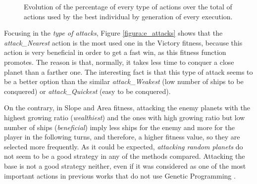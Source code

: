 \documentclass[preprint]{elsarticle}
\begin{document}
  \begin{figure}[ht]
  \begin{center}
  \end{center}
  \caption{Evolution of the percentage of every type of actions over the total of actions used by the best individual by generation of every execution.
  }
  \label{figura:e_actions}
  \end{figure}

Focusing in the {\em type of attacks}, Figure \ref{figura:e_attacks} shows that the \emph{attack\_Nearest} action is the most used one in the Victory fitness, because this action is very beneficial in order to get a fast win, as this fitness function promotes. The reason is that, normally, it takes less time to conquer a close planet than a farther one. The interesting fact is that this type of attack seems to be a better option than the similar \emph{attack\_Weakest} (low number of ships to be conquered) or \emph{attack\_Quickest} (easy to be conquered).

On the contrary, in Slope and Area fitness, attacking the enemy planets with the 
highest growing ratio ({\em wealthiest}) and the ones with high growing ratio but low number of ships ({\em beneficial}) imply less ships for the enemy and more for the player in the following turns, and therefore, a higher fitness value, so they are selected more frequently. 
As it could be expected, {\em attacking random planets} do not seem to be a good strategy in any of the methods compared. Attacking the base is not a good strategy neither, even if it was considered as one of the most important actions in previous works that do not use Genetic Programming \cite{Mora_noisy_jcst}.
\end{document}
